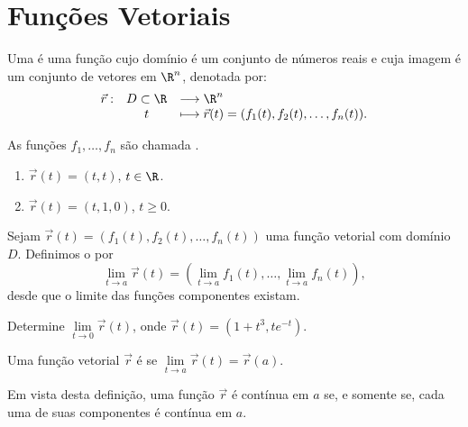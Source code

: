 \section{Funções Vetoriais}

\begin{definb}{}{}
Uma  é uma função cujo domínio é um conjunto de números reais e cuja imagem é um conjunto de vetores em $\R^n$, denotada por:
\[\begin{array}{lcl}
\vec{r}: & D\subset \R &  \longrightarrow \R^n\\
         & t           & \longmapsto \vec{r}(t)=(f_1(t),f_2(t),\ldots,f_n(t)).
\end{array}\]

As funções $f_1,\ldots,f_n$ são chamada .
\end{definb}

\begin{exeb}{}{}
\begin{enumerate}
\item $\vec{r}(t)=(t,t)$, $t\in \R$.
\item $\vec{r}(t)=(t,1,0)$, $t\geq 0$.
\end{enumerate}
\end{exeb}
\newpage



\begin{definb}{}{}
Sejam $\vec{r}(t)=(f_1(t),f_2(t),\ldots,f_n(t))$ uma função vetorial com domínio $D$. Definimos o  por
\[\lim\limits_{t\to a}\vec{r}(t)=\left(\lim\limits_{t\to a}f_1(t),\ldots,\lim\limits_{t\to a}f_n(t)\right), \]
desde que o limite das funções componentes existam.
\end{definb}

\begin{exeb}{}{}
Determine $\lim\limits_{t\to 0}\vec{r}(t)$, onde $\vec{r}(t)=(1+t^3, te^{-t})$.
\end{exeb}
\vfill


\begin{definb}{}{}
Uma função vetorial $\vec{r}$ é  se $\lim\limits_{t\to a}\vec{r}(t)=\vec{r}(a)$.
\end{definb}
Em vista desta definição, uma função $\vec{r}$ é {\color{blue}contínua em $a$} se, e somente se, cada uma de suas {\color{blue}componentes é contínua em $a$}.


\newpage




